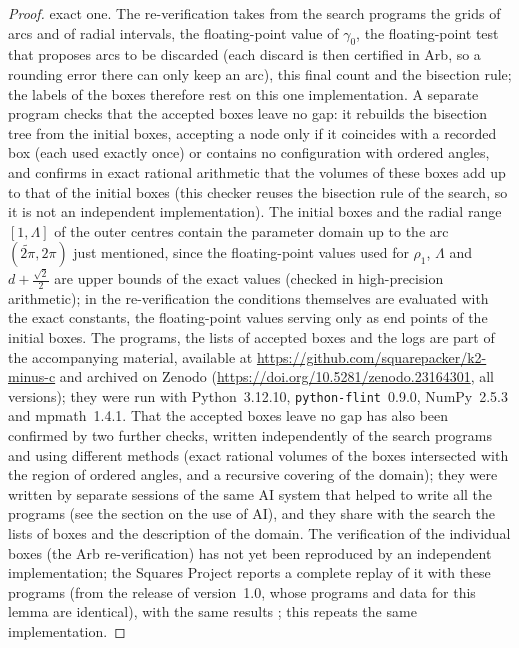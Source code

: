 \documentclass[11pt]{amsart}
\theoremstyle{definition}
\theoremstyle{remark}
\begin{document}
\begin{proof}
exact one. The re-verification takes from the search programs the grids of arcs and of radial intervals, the floating-point value of
$\gamma_0$, the floating-point test that proposes arcs to be discarded (each discard is then certified in Arb, so a rounding error there
can only keep an arc), this final count and the bisection rule; the labels of the boxes therefore rest on this one implementation.
A separate program checks that the accepted boxes leave no gap: it rebuilds the bisection tree from the initial boxes, accepting
a node only if it coincides with a recorded box (each used exactly once) or contains no configuration with ordered angles, and
confirms in exact rational arithmetic that the volumes of these boxes add up to that of the initial boxes (this checker reuses
the bisection rule of the search, so it is not an independent implementation). The initial boxes and the radial range $[1,\Lambda]$ of the outer centres
contain the parameter domain up to the arc $(\widetilde{2\pi},2\pi)$ just mentioned, since the floating-point values used for
$\rho_1$, $\Lambda$ and $d+\frac{\sqrt2}2$ are upper bounds of the exact values (checked in high-precision arithmetic);
in the re-verification the conditions themselves are evaluated with the exact constants, the floating-point values serving only
as end points of the initial boxes.
The programs, the lists of accepted boxes and the logs are part of the accompanying material, available at
\url{https://github.com/squarepacker/k2-minus-c} and archived on Zenodo (\url{https://doi.org/10.5281/zenodo.23164301}, all versions); they were run with Python~3.12.10,
\texttt{python-flint}~0.9.0, NumPy~2.5.3 and mpmath~1.4.1. That the accepted boxes leave no gap has also been confirmed by two further checks,
written independently of the search programs and using different methods (exact rational volumes of the boxes intersected with the
region of ordered angles, and a recursive covering of the domain); they were written by separate sessions of the same AI system that
helped to write all the programs (see the section on the use of AI), and they share with the search the lists of boxes and the description
of the domain. The verification of the individual boxes (the Arb re-verification) has not yet been reproduced by an independent
implementation; the Squares Project reports a complete replay of it with these programs (from the release of version~1.0, whose programs
and data for this lemma are identical), with the same results \cite{LevR}; this repeats the same implementation.
\end{proof}
\end{document}
